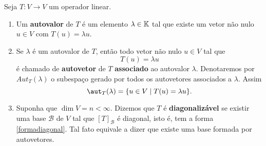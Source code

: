 \documentclass{beamer}
\begin{document}
    \begin{frame}
    \begin{definicao}
        Seja $T : V \to V$ um operador linear.
        \begin{enumerate}[label={\roman*})]
            \item Um \textbf{autovalor} de $T$ é um elemento $\lambda \in \mathbb{K}$ tal que existe um vetor não nulo $u \in V$ com $T(u) = \lambda u$.
            \item Se $\lambda$ é um autovalor de $T$, então todo vetor não nulo $u \in V$ tal que
            \[
            T(u) = \lambda u
            \]
            é chamado de \textbf{autovetor} de $T$ \textbf{associado} ao autovalor $\lambda$. Denotaremos por $Aut_T(\lambda)$ o subespaço gerado por todos os autovetores associados a $\lambda$. Assim
            \[
            \aut_T(\lambda) = \{u \in V \mid T(u) = \lambda u\}.
            \]
            \item Suponha que $\dim V = n < \infty$. Dizemos que $T$ é \textbf{diagonalizável} se existir uma base $\mathcal{B}$ de $V$ tal que $[T]_\mathcal{B}$ é diagonal, isto é, tem a forma \eqref{formadiagonal}. Tal fato equivale a dizer que existe uma base formada por autovetores.
        \end{enumerate}
    \end{definicao}
    \end{frame}
\end{document}
